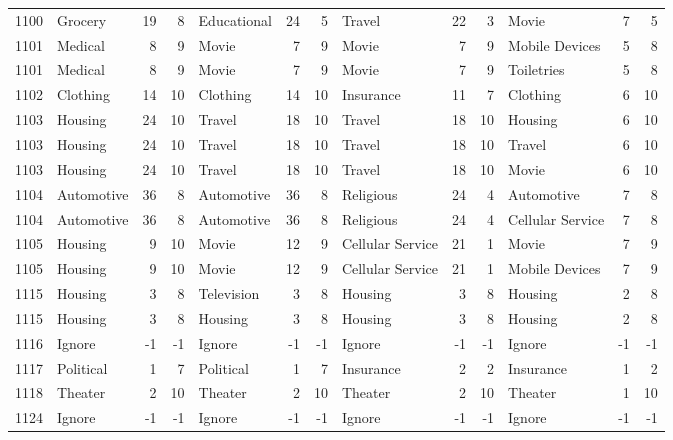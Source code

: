\begin{figure}[htbp]
\begin{tabular}{rlrrlrrlrrlrr}
    1100  & Grocery & 19    & 8     & Educational & 24    & 5     & Travel & 22    & 3     & Movie & 7     & 5 \\
    1101  & Medical & 8     & 9     & Movie & 7     & 9     & Movie & 7     & 9     & Mobile Devices & 5     & 8 \\
    1101  & Medical & 8     & 9     & Movie & 7     & 9     & Movie & 7     & 9     & Toiletries & 5     & 8 \\
    1102  & Clothing & 14    & 10    & Clothing & 14    & 10    & Insurance & 11    & 7     & Clothing & 6     & 10 \\
    1103  & Housing & 24    & 10    & Travel & 18    & 10    & Travel & 18    & 10    & Housing & 6     & 10 \\
    1103  & Housing & 24    & 10    & Travel & 18    & 10    & Travel & 18    & 10    & Travel & 6     & 10 \\
    1103  & Housing & 24    & 10    & Travel & 18    & 10    & Travel & 18    & 10    & Movie & 6     & 10 \\
    1104  & Automotive & 36    & 8     & Automotive & 36    & 8     & Religious & 24    & 4     & Automotive & 7     & 8 \\
    1104  & Automotive & 36    & 8     & Automotive & 36    & 8     & Religious & 24    & 4     & Cellular Service & 7     & 8 \\
    1105  & Housing & 9     & 10    & Movie & 12    & 9     & Cellular Service & 21    & 1     & Movie & 7     & 9 \\
    1105  & Housing & 9     & 10    & Movie & 12    & 9     & Cellular Service & 21    & 1     & Mobile Devices & 7     & 9 \\
    1115  & Housing & 3     & 8     & Television & 3     & 8     & Housing & 3     & 8     & Housing & 2     & 8 \\
    1115  & Housing & 3     & 8     & Housing & 3     & 8     & Housing & 3     & 8     & Housing & 2     & 8 \\
    1116  & Ignore & -1    & -1    & Ignore & -1    & -1    & Ignore & -1    & -1    & Ignore & -1    & -1 \\
    1117  & Political & 1     & 7     & Political & 1     & 7     & Insurance & 2     & 2     & Insurance & 1     & 2 \\
    1118  & Theater & 2     & 10    & Theater & 2     & 10    & Theater & 2     & 10    & Theater & 1     & 10 \\
    1124  & Ignore & -1    & -1    & Ignore & -1    & -1    & Ignore & -1    & -1    & Ignore & -1    & -1 \\

\end{tabular}
\end{figure}

